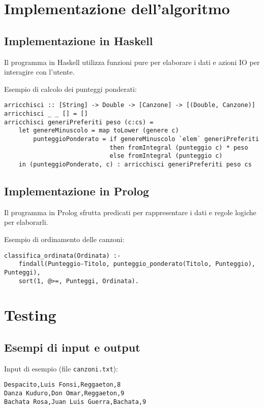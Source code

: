 \documentclass[a4paper,11pt]{article}
\begin{document}
\section{Implementazione dell'algoritmo}

\subsection{Implementazione in Haskell}
Il programma in Haskell utilizza funzioni pure per elaborare i dati e azioni IO per interagire con l'utente.

Esempio di calcolo dei punteggi ponderati:
\begin{lstlisting}[caption=Calcolo dei punteggi ponderati in Haskell]
arricchisci :: [String] -> Double -> [Canzone] -> [(Double, Canzone)]
arricchisci _ _ [] = []
arricchisci generiPreferiti peso (c:cs) =
    let genereMinuscolo = map toLower (genere c)
        punteggioPonderato = if genereMinuscolo `elem` generiPreferiti
                             then fromIntegral (punteggio c) * peso
                             else fromIntegral (punteggio c)
    in (punteggioPonderato, c) : arricchisci generiPreferiti peso cs
\end{lstlisting}

\subsection{Implementazione in Prolog}
Il programma in Prolog sfrutta predicati per rappresentare i dati e regole logiche per elaborarli.

Esempio di ordinamento delle canzoni:
\begin{lstlisting}[caption=Ordinamento delle canzoni in Prolog]
classifica_ordinata(Ordinata) :-
    findall(Punteggio-Titolo, punteggio_ponderato(Titolo, Punteggio), Punteggi),
    sort(1, @>=, Punteggi, Ordinata).
\end{lstlisting}

\section{Testing}

\subsection{Esempi di input e output}
Input di esempio (file \texttt{canzoni.txt}):
\begin{verbatim}
Despacito,Luis Fonsi,Reggaeton,8
Danza Kuduro,Don Omar,Reggaeton,9
Bachata Rosa,Juan Luis Guerra,Bachata,9
\end{verbatim}
\end{document}
